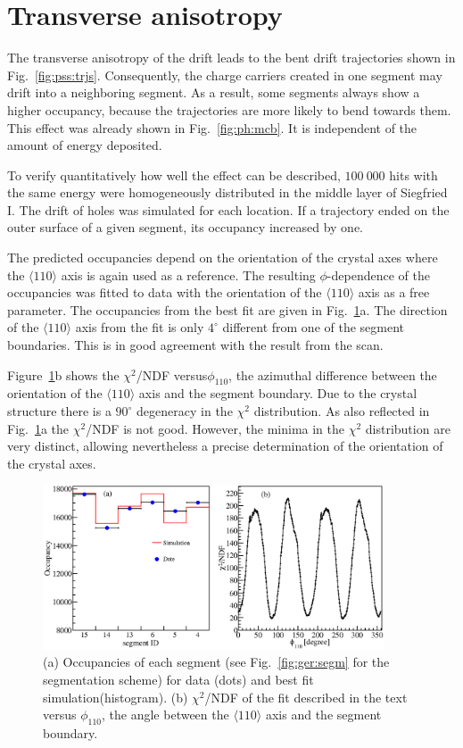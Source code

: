 \section{Transverse anisotropy}
\label{sec:psa:tra}
The transverse anisotropy of the drift leads to the bent drift
trajectories shown in Fig.~\ref{fig:pss:trjs}. Consequently, the
charge carriers created in one segment may drift into a neighboring
segment. As a result, some segments always show a higher occupancy,
because the trajectories are more likely to bend towards them. This
effect was already shown in Fig.~\ref{fig:ph:mcb}. It is independent
of the amount of energy deposited.

To verify quantitatively how well the effect can be described, $100\
000$ hits with the same energy were homogeneously distributed in the
middle layer of Siegfried I. The drift of holes was simulated for each
location. If a trajectory ended on the outer surface of a given
segment, its occupancy increased by one.

The predicted occupancies depend on the orientation of the crystal
axes where the $\langle 110 \rangle$ axis is again used as a
reference.  The resulting $\phi$-dependence of the occupancies was
fitted to data with the orientation of the $\langle 110 \rangle$ axis
as a free parameter. The occupancies from the best fit are given in
Fig.~\ref{fig:psa:focc}a.  The direction of the $\langle 110 \rangle$
axis from the fit is only $4^\circ$ different from one of the segment
boundaries. This is in good agreement with the result from the scan.

Figure~\ref{fig:psa:focc}b shows the $\chi^2$/NDF versus$\phi_{110}$,
the azimuthal difference between the orientation of the $\langle 110
\rangle$ axis and the segment boundary.  Due to the crystal structure
there is a $90^{\circ}$ degeneracy in the $\chi^2$ distribution.  As
also reflected in Fig.~\ref{fig:psa:focc}a the $\chi^2$/NDF is not
good.  However, the minima in the $\chi^2$ distribution are very
distinct, allowing nevertheless a precise determination of the
orientation of the crystal axes.

\begin{figure}[htbp]
\centering
\includegraphics[width=0.9\textwidth]{fitocc}
\caption{(a) Occupancies of each segment (see Fig.~\ref{fig:ger:segm}
for the segmentation scheme) for data (dots) and best fit
simulation(histogram). (b) $\chi^{2}$/NDF of the fit described in the
text versus $\phi_{110}$, the angle between the $\langle 110 \rangle$
axis and the segment boundary.}
\label{fig:psa:focc}
\end{figure}

